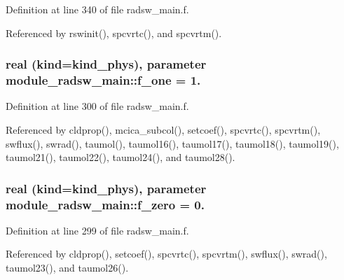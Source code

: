 Definition at line 340 of file radsw\+\_\+main.\+f.



Referenced by rswinit(), spcvrtc(), and spcvrtm().

\subsubsection[{\texorpdfstring{f\+\_\+one}{f_one}}]{\setlength{\rightskip}{0pt plus 5cm}real (kind=kind\+\_\+phys), parameter module\+\_\+radsw\+\_\+main\+::f\+\_\+one = 1.\hspace{0.3cm}{\ttfamily [private]}}\hypertarget{namespacemodule__radsw__main_ad256aaca9c9d6b5d161ae21f68989db6}{}\label{namespacemodule__radsw__main_ad256aaca9c9d6b5d161ae21f68989db6}


Definition at line 300 of file radsw\+\_\+main.\+f.



Referenced by cldprop(), mcica\+\_\+subcol(), setcoef(), spcvrtc(), spcvrtm(), swflux(), swrad(), taumol(), taumol16(), taumol17(), taumol18(), taumol19(), taumol21(), taumol22(), taumol24(), and taumol28().

\subsubsection[{\texorpdfstring{f\+\_\+zero}{f_zero}}]{\setlength{\rightskip}{0pt plus 5cm}real (kind=kind\+\_\+phys), parameter module\+\_\+radsw\+\_\+main\+::f\+\_\+zero = 0.\hspace{0.3cm}{\ttfamily [private]}}\hypertarget{namespacemodule__radsw__main_ad54ac2d2bd5c4b3bd692c76d2a0bcc5d}{}\label{namespacemodule__radsw__main_ad54ac2d2bd5c4b3bd692c76d2a0bcc5d}


Definition at line 299 of file radsw\+\_\+main.\+f.



Referenced by cldprop(), setcoef(), spcvrtc(), spcvrtm(), swflux(), swrad(), taumol23(), and taumol26().

